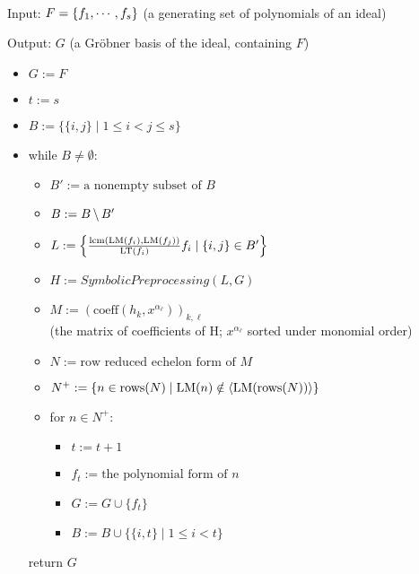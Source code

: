 \begin{definition}
    \label{def:FaugereF4}
    \leanok
    ~\\
    
    Input: \(F = \{ f_1, \cdots, f_s \}\)
    (a generating set of polynomials of an ideal)

    Output: \(G\) (a Gr\"obner basis of the ideal, containing \(F\))

    \begin{itemize}
        \item[] \(G := F\)
        \item[] \(t := s\)
        \item[] \(B := \{\{i, j\} \mid 1 \le i < j \le s\}\)
        \item[] while \(B \ne \emptyset\):
            \begin{itemize}
                \item[] \(B' := \textrm{a nonempty subset of } B\)
                \item[] \(B := B \,\backslash\, B'\)
                \item[] \(L := \left\{\frac{\mathrm{lcm}(\mathrm{LM}(f_i), \mathrm{LM}(f_j))}{\mathrm{LT}(f_i)} f_i \mid \{i, j\} \in B' \right\}\)
                \item[] \(H := SymbolicPreprocessing(L, G)\)
                \item[] \(M := (\mathrm{coeff}(h_k, x^{\alpha_\ell}))_{k, \ell}\)\\
                (the matrix of coefficients of H; \(x^{\alpha_\ell}\) sorted under monomial order)
                \item[] \(N := \textrm{row reduced echelon form of } M\)
                \item[] \(N^+ := \{n \in \mathrm{rows}(N) \mid \mathrm{LM}(n) \notin \left< \mathrm{LM}(\mathrm{rows}(N)) \right>\}\)
                \item[] for \(n \in N^+\):
                    \begin{itemize}
                        \item[] \(t := t + 1\)
                        \item[] \(f_t := \textrm{the polynomial form of } n\)
                        \item[] \(G := G \cup \{f_t\}\)
                        \item[] \(B := B \cup \{\{i, t\} \mid 1 \le i < t\}\)
                    \end{itemize}
            \end{itemize}
        return \(G\)
    \end{itemize}
\end{definition}

